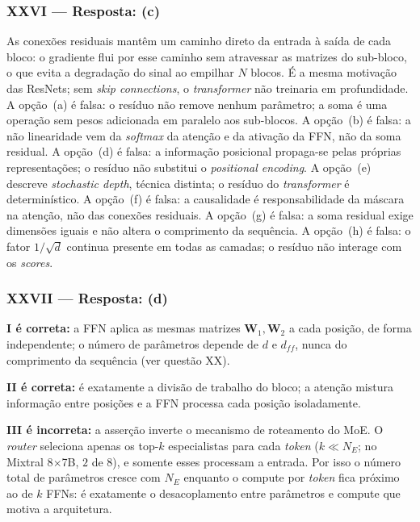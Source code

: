 \documentclass{dlproblemset}
\begin{document}
\subsubsection*{XXVI — Resposta: (c)}
As conexões residuais mantêm um caminho direto da entrada à saída de cada bloco: o
gradiente flui por esse caminho sem atravessar as matrizes do sub-bloco, o que evita a
degradação do sinal ao empilhar $N$ blocos. É a mesma motivação das ResNets; sem
\textit{skip connections}, o \textit{transformer} não treinaria em profundidade.
A opção~(a) é falsa: o resíduo não remove nenhum parâmetro; a soma é uma operação sem
pesos adicionada em paralelo aos sub-blocos. A opção~(b) é falsa: a não linearidade
vem da \textit{softmax} da atenção e da ativação da FFN, não da soma residual. A
opção~(d) é falsa: a informação posicional propaga-se pelas próprias representações; o
resíduo não substitui o \textit{positional encoding}. A opção~(e) descreve
\textit{stochastic depth}, técnica distinta; o resíduo do \textit{transformer} é
determinístico. A opção~(f) é falsa: a causalidade é responsabilidade da máscara na
atenção, não das conexões residuais. A opção~(g) é falsa: a soma residual exige
dimensões iguais e não altera o comprimento da sequência. A opção~(h) é falsa: o fator
$1/\sqrt{d}$ continua presente em todas as camadas; o resíduo não interage com os
\textit{scores}.

\subsubsection*{XXVII — Resposta: (d)}
\textbf{I é correta:} a FFN aplica as mesmas matrizes $\mathbf{W}_1, \mathbf{W}_2$ a
cada posição, de forma independente; o número de parâmetros depende de $d$ e
$d_{ff}$, nunca do comprimento da sequência (ver questão XX).

\textbf{II é correta:} é exatamente a divisão de trabalho do bloco; a atenção mistura
informação entre posições e a FFN processa cada posição isoladamente.

\textbf{III é incorreta:} a asserção inverte o mecanismo de roteamento do MoE. O \textit{router}
seleciona apenas os top-$k$ especialistas para cada \textit{token} ($k \ll N_E$; no
Mixtral 8$\times$7B, $2$ de $8$), e somente esses processam a entrada. Por isso o
número total de parâmetros cresce com $N_E$ enquanto o compute por \textit{token} fica
próximo ao de $k$ FFNs: é exatamente o desacoplamento entre parâmetros e
compute que motiva a arquitetura.
\end{document}
